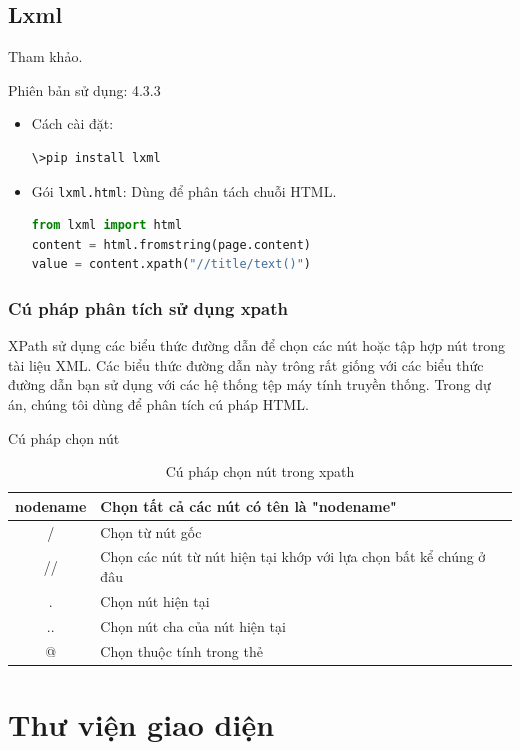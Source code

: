 \subsection{Lxml}
Tham khảo\cite{lxml}.
\par
Phiên bản sử dụng: 4.3.3
\begin{itemize}
	\item Cách cài đặt:
	\begin{lstlisting}[language=bash]
\>pip install lxml
	\end{lstlisting}
	\item Gói \texttt{lxml.html}: Dùng để phân tách chuỗi HTML.
	\begin{lstlisting}[language=Python]
from lxml import html
content = html.fromstring(page.content)
value = content.xpath("//title/text()")
	\end{lstlisting}
\end{itemize}
\subsubsection{Cú pháp phân tích sử dụng xpath}
XPath sử dụng các biểu thức đường dẫn để chọn các nút hoặc tập hợp nút trong tài liệu XML. Các biểu thức đường dẫn này trông rất giống với các biểu thức đường dẫn bạn sử dụng với các hệ thống tệp máy tính truyền thống. Trong dự án, chúng tôi dùng để phân tích cú pháp HTML\cite{xpath}.
\par
Cú pháp chọn nút
\begin{table}[!ht]
	\centering
	\begin{tabular}{|c|l|}
		\hline
		nodename & Chọn tất cả các nút có tên là "nodename"\\
		\hline
		/ & Chọn từ nút gốc\\
		\hline
		// & Chọn các nút từ nút hiện tại khớp với lựa chọn bất kể chúng ở đâu\\
		\hline
		. & Chọn nút hiện tại\\
		\hline
		.. & Chọn nút cha của nút hiện tại\\
		\hline
		@ & Chọn thuộc tính trong thẻ\\
		\hline
	\end{tabular}
	\caption{Cú pháp chọn nút trong xpath}
\end{table}
\section{Thư viện giao diện}
